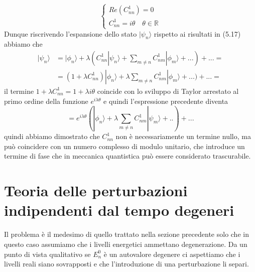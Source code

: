 \begin{equation}
	\left \{ \begin{array}{l}
		Re(C_{nn}^1) = 0 \\[0.3cm]
		C_{nn}^1 = i\theta \quad \theta \in \mathbb{R}
	\end{array} \right.
\end{equation}
Dunque riscrivendo l'espansione dello stato $|\psi_n \rangle$ rispetto ai risultati in (5.17) abbiamo che
\begin{align*}
	|\psi_n \rangle & = | \phi_n \rangle  + \lambda (C_{nn}^1 | \psi_n \rangle + \sum_{m \neq n}C_{nm}^1 |\phi_m \rangle +...)+... = \\[0.5cm]
	& =(1+ \lambda C_{nn}^1)|\phi_n \rangle + \lambda\sum_{m \neq n}C_{nm}^1 |\phi_m \rangle +...)+... =   
\end{align*}
il termine $1+ \lambda C_{nn}^1 = 1 + \lambda i \theta$ coincide con lo sviluppo di Taylor arrestato al primo ordine della funzione $e^{i\lambda \theta}$ e quindi l'espressione precedente diventa
\begin{equation*}
	= e^{i \lambda \theta} (|\phi_n \rangle  + \lambda \sum_{m \neq n}C_{nm}^1|\psi_m \rangle +.. ) + ...
\end{equation*}
quindi abbiamo dimostrato che $C_{nn}^1$ non \`e necessariamente un termine nullo, ma pu\`o coincidere con un numero complesso di modulo unitario, che introduce un termine di fase che in meccanica quantistica pu\`o essere considerato trascurabile.

\section{Teoria delle perturbazioni indipendenti dal tempo degeneri}

Il problema \`e il medesimo di quello trattato nella sezione precedente solo che in questo caso assumiamo che i livelli energetici ammettano degenerazione.
Da un punto di vista qualitativo se $E_n^0$ \`e un autovalore degenere ci aspettiamo che i livelli reali siano sovrapposti e che l'introduzione di una perturbazione li separi.

